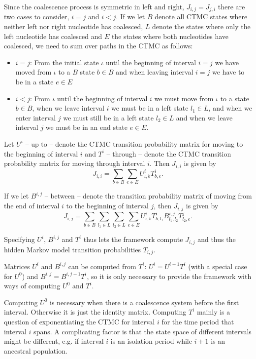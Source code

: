 \documentclass[11pt]{article}
\begin{document}
Since the coalescence process is symmetric in left and right, $J_{i,j}=J_{j,i}$ there are two cases to consider, $i=j$ and $i<j$. If we let $B$ denote all CTMC states where neither left nor right nucleotide has coalesced, $L$ denote the states where only the left nucleotide has coalesced and $E$ the states where both nucleotides have coalesced, we need to sum over paths in the CTMC as follows:

\begin{itemize}
\item $i=j$: From the initial state $\iota$ until the beginning of interval $i=j$ we have moved from $\iota$ to a $B$ state $b\in B$ and when leaving interval $i=j$ we have to be in a state $e\in E$

\item $i<j$: From $\iota$ until the beginning of interval $i$ we must move from $\iota$ to a state $b\in B$, when we leave interval $i$ we must be in a left state $l_1\in L$, and when we enter interval $j$ we must still be in a left state $l_2\in L$ and when we leave interval $j$ we must be in an end state $e\in E$.
\end{itemize}

Let $U^i$ -- up to -- denote the CTMC transition probability matrix for moving to the beginning of interval $i$ and $T^i$ -- through -- denote the CTMC transition probability matrix for moving through interval $i$. Then $J_{i,i}$ is given by
\[
    J_{i,i} = \sum_{b \in B} \sum_{e\in E} U^i_{\iota,b} T^i_{b,e}.
\]

If we let $B^{i,j}$ -- between -- denote the transition probability matrix of moving from the end of interval $i$ to the beginning of interval $j$, then $J_{i,j}$ is given by
\[
    J_{i,j} = \sum_{b \in B} \sum_{l_1 \in L} \sum_{l_2\in L} \sum_{e \in E}
        U^i_{\iota,b} T^i_{b,l_1} B^{i,j}_{l_1,l_2} T^j_{l_2,e}.
\]

Specifying $U^i$, $B^{i,j}$ and $T^i$ thus lets the framework compute $J_{i,j}$ and thus the hidden Markov model transition probabilities $T_{i,j}$.

Matrices $U^i$ and $B^{i,j}$ can be computed from $T^i$: $U^i = U^{i-1}T^i$ (with a special case for $U^0$) and $B^{i,j}=B^{i,j-1}T^i$, so it is only necessary to provide the framework with ways of computing $U^0$ and $T^i$.

Computing $U^0$ is necessary when there is a coalescence system before the first interval. Otherwise it is just the identity matrix. Computing $T^i$ mainly is a question of exponentiating the CTMC for interval $i$ for the time period that interval $i$ spans. A complicating factor is that the state space of different intervals might be different, e.g. if interval $i$ is an isolation period while $i+1$ is an ancestral population.
\end{document}
